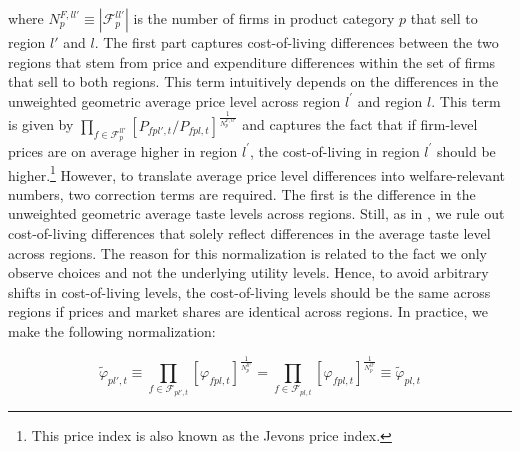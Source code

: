 \noindent where $N^{F,ll'}_{p} \equiv |\mathcal{F}^{ll'}_{p}|$ is the number of firms in product category $p$ that sell to region $l'$ and $l$. The first part captures cost-of-living differences between the two regions that stem from price and expenditure differences within the set of firms that sell to both regions. This term intuitively depends on the differences in the unweighted geometric average price level across region $l^{'}$ and region $l$. This term is given by $\prod_{f \in \mathcal{F}^{ll'}_{p}} \left[P_{fpl',t}\bigg /P_{fpl,t}\right]^{\frac{1}{N^{F,ll'}_{p}}}$ and captures the fact that if firm-level prices are on average higher in region $l^{'}$, the cost-of-living in region $l^{'}$ should be higher.\footnote{This price index is also known as the Jevons price index.} However, to translate average price level differences into welfare-relevant numbers, two correction terms are required. The first is the difference in the unweighted geometric average taste levels across regions. Still, as in \citet{Redding2020}, we rule out cost-of-living differences that solely reflect differences in the average taste level across regions. The reason for this normalization is related to the fact we only observe choices and not the underlying utility levels. Hence, to avoid arbitrary shifts in cost-of-living levels, the cost-of-living levels should be the same across regions if prices and market shares are identical across regions. In practice, we make the following normalization: 
\begin{linenomath*}
    \begin{equation*}
    \tilde{\varphi}_{pl',t} \equiv 
        \prod_{f \in \mathcal{F}_{pl',t}} 
        \left[\varphi_{fpl,t} \right]^{\frac{1}{N^{ll'}_{p}}} 
    = 
        \prod_{f \in \mathcal{F}_{pl,t}} 
        \left[\varphi_{fpl,t} \right]^{\frac{1}{N^{ll'}_{p}}}
    \equiv  \tilde{\varphi}_{pl,t} 
\end{equation*}
\end{linenomath*}
